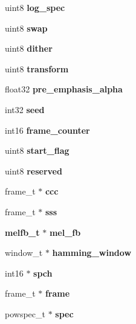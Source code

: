 \begin{CompactItemize}
\item 
uint8 \textbf{log\_\-spec}\label{structfe__s_7d3d6513ae6b60632d14c1e1d5dfe891}

\item 
uint8 \textbf{swap}\label{structfe__s_b08200d2bfc6d868536d802501525179}

\item 
uint8 \textbf{dither}\label{structfe__s_bd7b32a70dc6512134e39dd54d160689}

\item 
uint8 \textbf{transform}\label{structfe__s_49f2e495d938acaf5c918059e99854e2}

\item 
float32 \textbf{pre\_\-emphasis\_\-alpha}\label{structfe__s_a7dc496e33955b7f06f83715c05ded8e}

\item 
int32 \textbf{seed}\label{structfe__s_0f42573b9f0ce0247181c5dd79e16b67}

\item 
int16 \textbf{frame\_\-counter}\label{structfe__s_8df2a5203ac64d1dc619f99a35dd38fd}

\item 
uint8 \textbf{start\_\-flag}\label{structfe__s_a05ae3633c2b33e77a7b8b90e769176b}

\item 
uint8 \textbf{reserved}\label{structfe__s_18670c79bc0cd9848fdf4711c5094542}

\item 
frame\_\-t $\ast$ \textbf{ccc}\label{structfe__s_fc472de43bd747de659dd57bc9a74fae}

\item 
frame\_\-t $\ast$ \textbf{sss}\label{structfe__s_6525c59397073d363e1844c28746fcb9}

\item 
{\bf melfb\_\-t} $\ast$ \textbf{mel\_\-fb}\label{structfe__s_e5a054dbac5e32cf028b6d6d4c9391bd}

\item 
window\_\-t $\ast$ \textbf{hamming\_\-window}\label{structfe__s_d47433337a370e452070ffddce87e474}

\item 
int16 $\ast$ \textbf{spch}\label{structfe__s_7d49693c1fa1b14bbcd25b87ad97935b}

\item 
frame\_\-t $\ast$ \textbf{frame}\label{structfe__s_6fe89784eb5d23ee812439f427d33fe6}

\item 
powspec\_\-t $\ast$ \textbf{spec}\label{structfe__s_f455b0ee3f8d81ca84ac88d4ea04e860}


\end{CompactItemize}
